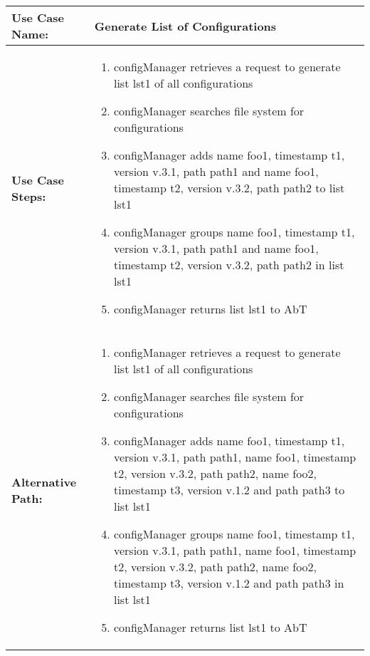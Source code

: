 
\begin{tabularx}{\linewidth}{|l|X|}
\hline
\textbf{Use Case Name:} & \textbf{Generate List of Configurations} \\
\hline
\textbf{Use Case Steps:} & 
\begin{minipage}{\linewidth} 
  \vspace{0.05em}
  \begin{enumerate}
	\item configManager retrieves a request to generate list lst1 of all configurations
	\item configManager searches file system for configurations
	\item configManager adds name foo1, timestamp t1, version v.3.1, path path1 and name foo1, timestamp t2, version v.3.2, path path2 to list lst1
	\item configManager groups name foo1, timestamp t1, version v.3.1, path path1 and name foo1, timestamp t2, version v.3.2, path path2 in list lst1
	\item configManager returns list lst1 to AbT 
  \end{enumerate}
  \vspace{0.05em}
\end{minipage}
\\
\hline 
\textbf{Alternative Path:} &
\begin{minipage}{\linewidth}
  \vspace{0.05em}
  \begin{enumerate}
	\item configManager retrieves a request to generate list lst1 of all configurations
	\item configManager searches file system for configurations
	\item configManager adds name foo1, timestamp t1, version v.3.1, path path1, name foo1, timestamp t2, version v.3.2, path path2, name foo2, timestamp t3, version v.1.2 and path path3 to list lst1
	\item configManager groups name foo1, timestamp t1, version v.3.1, path path1, name foo1, timestamp t2, version v.3.2, path path2, name foo2, timestamp t3, version v.1.2 and path path3 in list lst1
	\item configManager returns list lst1 to AbT 
  \end{enumerate}
  \vspace{0.05em} 
\end{minipage}
\\
\hline
\end{tabularx}


